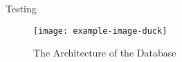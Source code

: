 Testing 

\begin{figure}[h!]
    \centering
    \texttt{[image: example-image-duck]}
    \caption{The Architecture of the Database}
\end{figure}